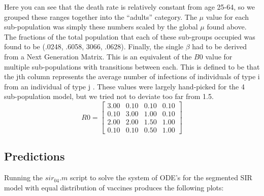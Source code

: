 \documentclass[titlepage]{article}
\begin{document}
    Here you can see that the death rate is relatively constant from age 25-64, so we grouped these ranges together into the ``adults'' category. The $\mu$ value for each sub-population was simply these numbers scaled by the global $\mu$ found above. The fractions of the total population that each of these sub-groups occupied \cite{pop} was found to be (.0248, .6058, 3066, .0628). Finally, the single $\beta$ had to be derived from a Next Generation Matrix. This is an equivalent of the $B0$ value for multiple sub-populations with transitions between each. This is defined to be that the jth column represents the average number of infections of individuals of type i from an individual of type j \cite{SIR}. These values were largely hand-picked for the 4 sub-population model, but we tried not to deviate too far from 1.5.
    \[
        R0 =
        \begin{bmatrix}
        3.00 & 0.10 & 0.10 & 0.10 \\
        0.10 & 3.00 & 1.00 & 0.10 \\
        2.00 & 2.00 & 1.50 & 1.00 \\
        0.10 & 0.10 & 0.50 & 1.00
        \end{bmatrix}
    \]

\subsection{Predictions}
	Running the $sir_{04}.m$ script to solve the system of ODE's for the segmented SIR model with equal distribution of vaccines produces the following plots:
\end{document}
